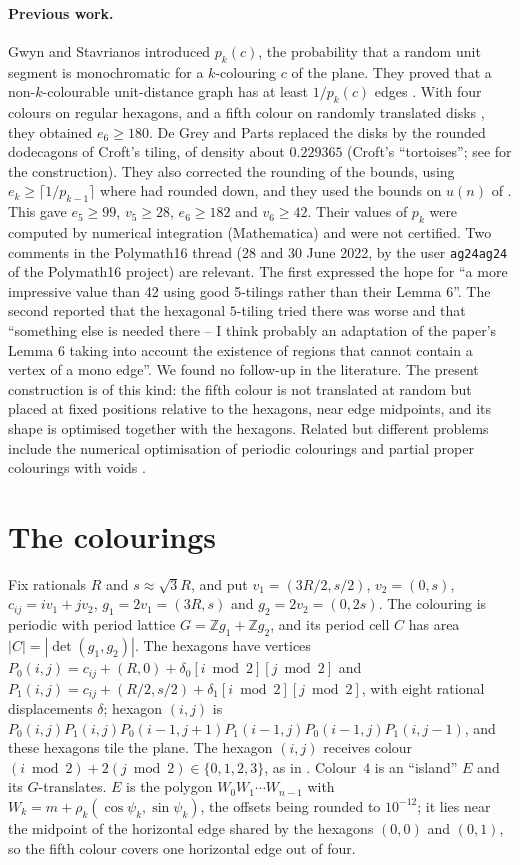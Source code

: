 \documentclass[10pt,a4paper]{article}
\newcommand{\Z}{\mathbb{Z}}
\begin{document}
\paragraph{Previous work.} Gwyn and Stavrianos \cite{GS} introduced $p_k(c)$, the probability that a
random unit segment is monochromatic for a $k$-colouring $c$ of the plane. They proved that a
non-$k$-colourable unit-distance graph has at least $1/p_k(c)$ edges \cite[Lemma~2.10]{GS}. With four
colours on regular hexagons, and a fifth colour on randomly translated disks
\cite[Lemma~2.23]{GS}, they obtained $e_6\ge180$. De Grey and Parts \cite{dGP} replaced the disks by
the rounded dodecagons of Croft's tiling, of density about $0.229365$ (Croft's ``tortoises''; see
\cite{KMOR} for the construction). They also corrected the rounding of the bounds, using
$e_k\ge\lceil1/p_{k-1}\rceil$ where \cite{GS} had rounded down, and they used the bounds on $u(n)$ of
\cite{AP}. This gave $e_5\ge99$, $v_5\ge28$, $e_6\ge182$ and $v_6\ge42$. Their values of $p_k$ were
computed by numerical integration (Mathematica) and were not certified. Two comments in the
Polymath16 thread \cite{PM16} (28 and 30 June 2022, by the user \texttt{ag24ag24} of the Polymath16 project) are relevant. The first expressed
the hope for ``a more impressive value than 42 using good 5-tilings rather than their Lemma 6''. The
second reported that the hexagonal $5$-tiling tried there was worse and that ``something else is needed there --
I think probably an adaptation of the paper's Lemma 6 taking into account the existence of regions
that cannot contain a vertex of a mono edge''. We found no follow-up in the literature. The present construction is of
this kind: the fifth colour is not translated at random but placed at fixed positions relative to the
hexagons, near edge midpoints, and its shape is optimised together with the hexagons. Related
but different problems include the numerical optimisation of periodic colourings
\cite{Mundinger} and partial proper colourings with voids \cite{Parts}.

\section{The colourings}

Fix rationals $R$ and $s\approx\sqrt3R$, and put $v_1=(3R/2,s/2)$, $v_2=(0,s)$, $c_{ij}=iv_1+jv_2$,
$g_1=2v_1=(3R,s)$ and $g_2=2v_2=(0,2s)$. The colouring is periodic with period lattice
$G=\Z g_1+\Z g_2$, and its period cell $C$ has area $|C|=|\det(g_1,g_2)|$. The hexagons have vertices
$P_0(i,j)=c_{ij}+(R,0)+\delta_0[i\bmod2][j\bmod2]$ and $P_1(i,j)=c_{ij}+(R/2,s/2)+\delta_1[i\bmod2][j\bmod2]$,
with eight rational displacements $\delta$; hexagon $(i,j)$ is
$P_0(i,j)P_1(i,j)P_0(i{-}1,j{+}1)P_1(i{-}1,j)P_0(i{-}1,j)P_1(i,j{-}1)$, and these hexagons tile the plane.
The hexagon $(i,j)$ receives colour $(i\bmod 2)+2(j\bmod 2)\in\{0,1,2,3\}$, as in \cite[Fig.~6]{GS}.
Colour~$4$ is an ``island'' $E$ and its $G$-translates. $E$ is the polygon $W_0W_1\cdots W_{n-1}$ with
$W_k=m+\rho_k(\cos\psi_k,\sin\psi_k)$, the offsets being rounded to $10^{-12}$; it lies near the midpoint of the
horizontal edge shared by the hexagons $(0,0)$ and $(0,1)$, so the fifth colour covers one horizontal edge
out of four.
\end{document}
